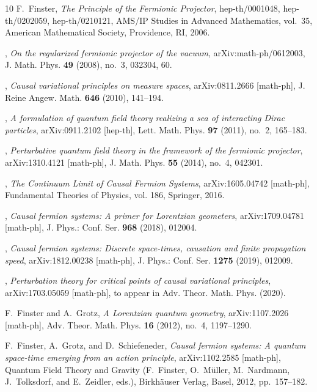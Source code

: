 \documentclass[reqno,11pt]{amsart}
\numberwithin{equation}{section}
\newcommand{\1}{\mbox{\rm 1 \hspace{-1.05 em} 1}}
\begin{document}
{{\begin{thebibliography}{10}
F.~Finster, \emph{The {P}rinciple of the {F}ermionic {P}rojector},
  hep-th/0001048, hep-th/0202059, hep-th/0210121, AMS/IP Studies in Advanced
  Mathematics, vol.~35, American Mathematical Society, Providence, RI, 2006.

\bysame, \emph{On the regularized fermionic projector of the vacuum},
  arXiv:math-ph/0612003, J. Math. Phys. \textbf{49} (2008), no.~3, 032304, 60.

\bysame, \emph{Causal variational principles on measure spaces},
  arXiv:0811.2666 [math-ph], J. Reine Angew. Math. \textbf{646} (2010),
  141--194.

\bysame, \emph{A formulation of quantum field theory realizing a sea of
  interacting {D}irac particles}, arXiv:0911.2102 [hep-th], Lett. Math. Phys.
  \textbf{97} (2011), no.~2, 165--183.

\bysame, \emph{Perturbative quantum field theory in the framework of the
  fermionic projector}, arXiv:1310.4121 [math-ph], J. Math. Phys. \textbf{55}
  (2014), no.~4, 042301.

\bysame, \emph{The {C}ontinuum {L}imit of {C}ausal {F}ermion {S}ystems},
  arXiv:1605.04742 [math-ph], Fundamental Theories of Physics, vol. 186,
  Springer, 2016.

\bysame, \emph{Causal fermion systems: A primer for {L}orentzian geometers},
  arXiv:1709.04781 [math-ph], J. Phys.: Conf. Ser. \textbf{968} (2018), 012004.

\bysame, \emph{Causal fermion systems: {D}iscrete space-times, causation and
  finite propagation speed}, arXiv:1812.00238 [math-ph], J. Phys.: Conf. Ser.
  \textbf{1275} (2019), 012009.

\bysame, \emph{Perturbation theory for critical points of causal variational
  principles}, arXiv:1703.05059 [math-ph], to appear in Adv. Theor. Math. Phys.
  (2020).

F.~Finster and A.~Grotz, \emph{A {L}orentzian quantum geometry},
  arXiv:1107.2026 [math-ph], Adv. Theor. Math. Phys. \textbf{16} (2012), no.~4,
  1197--1290.

F.~Finster, A.~Grotz, and D.~Schiefeneder, \emph{Causal fermion systems: A
  quantum space-time emerging from an action principle}, arXiv:1102.2585
  [math-ph], {Q}uantum {F}ield {T}heory and {G}ravity (F.~Finster, O.~M\"uller,
  M.~Nardmann, J.~Tolksdorf, and E.~Zeidler, eds.), Birkh\"auser Verlag, Basel,
  2012, pp.~157--182.


\end{thebibliography}}}
\end{document}

